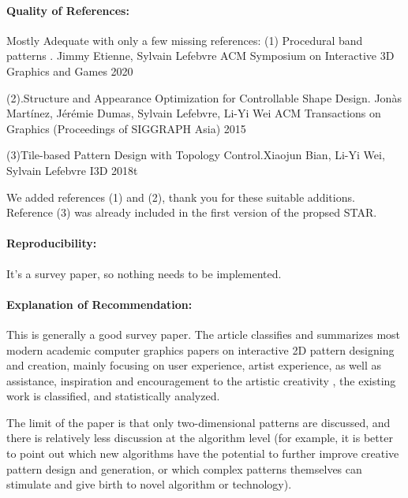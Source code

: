 \documentclass{egpubl}
\newcommand{\rev}[2]{{\color{greenrev}\textsuperscript{#1}#2}}
\renewcommand{\rev}[2]{{#2}}
\begin{document}
\paragraph*{Quality of References:} Mostly Adequate with only a few missing references:
(1)
Procedural band patterns . Jimmy Etienne, Sylvain Lefebvre
ACM Symposium on Interactive 3D Graphics and Games 2020

(2).Structure and Appearance Optimization for Controllable Shape Design.
Jonàs Martínez, Jérémie Dumas, Sylvain Lefebvre, Li-Yi Wei
ACM Transactions on Graphics (Proceedings of SIGGRAPH Asia) 2015

(3)Tile-based Pattern Design with Topology Control.Xiaojun Bian, Li-Yi Wei, Sylvain Lefebvre
I3D 2018t

\rev{Comment}{
    We added references (1) and (2), thank you for these suitable additions. Reference (3) was already included in the first version of the propsed STAR.
}

\paragraph*{Reproducibility:} It's a survey paper, so nothing needs to be implemented.
\paragraph*{Explanation of Recommendation:} This is generally a good survey paper. The article classifies and summarizes most modern academic computer graphics papers on interactive 2D pattern designing and creation, mainly focusing on user experience, artist experience, as well as assistance, inspiration and encouragement  to the artistic creativity , the existing work is classified, and statistically analyzed.

The limit of the paper is that only two-dimensional patterns are discussed, and there is relatively less discussion at the algorithm level (for example, it is better to point out which new algorithms have the potential to further improve creative pattern design and generation, or which complex patterns themselves can stimulate and give birth to novel  algorithm or  technology).





%  
%        




\printbibliography
\end{document}
